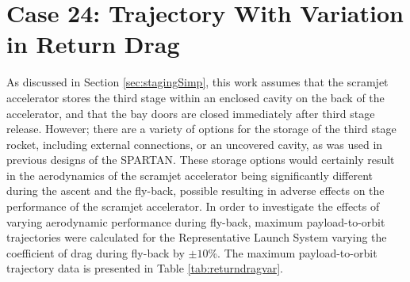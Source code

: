 \section{Case 24: Trajectory With Variation in Return Drag}\label{app:returnDrag}
As discussed in Section \ref{sec:stagingSimp}, this work assumes that the scramjet accelerator stores the third stage within an enclosed cavity on the back of the accelerator, and that the bay doors are closed immediately after third stage release. However; there are a variety of options for the storage of the third stage rocket, including external connections, or an uncovered cavity, as was used in previous designs of the SPARTAN\cite{Preller2017b}. These storage options would certainly result in the aerodynamics of the scramjet accelerator being significantly different during the ascent and the fly-back, possible resulting in adverse effects on the performance of the scramjet accelerator.
In order to investigate the effects of varying aerodynamic performance during fly-back, maximum payload-to-orbit trajectories were calculated for the Representative Launch System varying the coefficient of drag during fly-back by $\pm10$\%. The maximum payload-to-orbit trajectory data is presented in Table \ref{tab:returndragvar}.

